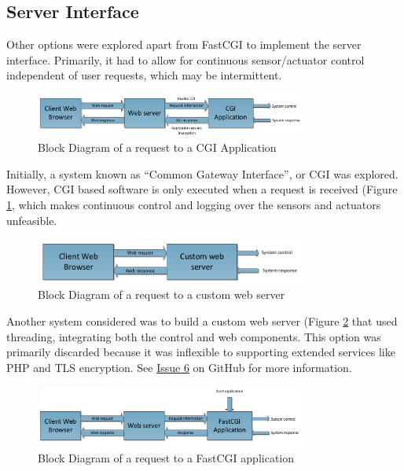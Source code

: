 \subsection{Server Interface} \label{Server Interface}
Other options were explored apart from FastCGI to implement the server interface. Primarily, it had to allow for continuous sensor/actuator control independent of user requests, which may be intermittent.

\begin{figure}[H]
	\centering
	\includegraphics[width=0.8\textwidth]{figures/cgi.png}
	\caption{Block Diagram of a request to a CGI Application} 
	\label{cgi.png}
\end{figure}

Initially, a system known as ``Common Gateway Interface'', or CGI was explored. However, CGI based software is only executed when a request is received (Figure \ref{cgi.png}, which makes continuous control and logging over the sensors and actuators unfeasible. 

\begin{figure}[H]
	\centering
	\includegraphics[width=0.8\textwidth]{figures/custom_webserver.png}
	\caption{Block Diagram of a request to a custom web server} 
	\label{custom_webserver.png}
\end{figure}

Another system considered was to build a custom web server (Figure \ref{custom_webserver.png} that used threading, integrating both the control and web components. This option was primarily discarded because it was inflexible to supporting extended services like PHP and TLS encryption. See \href{https://github.com/szmoore/MCTX3420/issues/6}{Issue 6} on GitHub for more information.

\begin{figure}[H]
	\centering
	\includegraphics[width=0.8\textwidth]{figures/fastcgi.png}
	\caption{Block Diagram of a request to a FastCGI application} 
	\label{fastcgi.png}
\end{figure}

